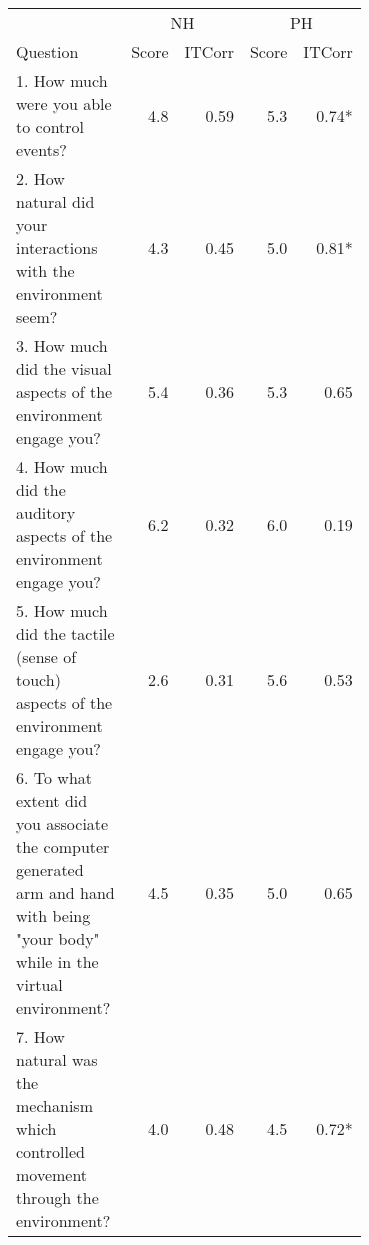 \begin{tabular}{m{0.7\linewidth}rrrr}
\toprule
                                 & \multicolumn{2}{c}{NH} & \multicolumn{2}{c}{PH} \\
Question & Score &  ITCorr & Score &  ITCorr \\
\midrule
1. How much were you able to control events?                                                                                                                                          & 4.8 &  0.59  & 5.3 &  0.74* \\
2. How natural did your interactions with the environment seem?                                                                                                                       & 4.3 &  0.45  & 5.0 &  0.81* \\
3. How much did the visual aspects of the environment engage you?                                                                                                                     & 5.4 &  0.36  & 5.3 &  0.65  \\
4. How much did the auditory aspects of the environment engage you?                                                                                                                   & 6.2 &  0.32  & 6.0 &  0.19  \\
5. How much did the tactile (sense of touch) aspects of the environment engage you?                                                                                                   & 2.6 &  0.31  & 5.6 &  0.53  \\
6. To what extent did you associate the computer generated arm and hand with being "your body" while in the virtual environment?                                                      & 4.5 &  0.35  & 5.0 &  0.65  \\
7. How natural was the mechanism which controlled movement through the environment?                                                                                                   & 4.0 &  0.48  & 4.5 &  0.72* \\

\end{tabular}
